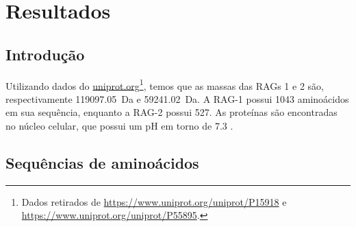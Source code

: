 \documentclass[
	12pt,				%
	openright,			%
	twoside,			%
	a4paper,			%
	]{abntex2}
\begin{document}


\chapter{Resultados}

\section{Introdução}

Utilizando dados do \url{uniprot.org}\footnote{
Dados retirados de \url{https://www.uniprot.org/uniprot/P15918} e \url{https://www.uniprot.org/uniprot/P55895}.}, temos que as massas das RAGs 1 e 2 são, respectivamente \SI{119097.05}{\dalton} e \SI{59241.02}{\dalton}. A RAG-1 possui 1043 aminoácidos em sua sequência, enquanto a RAG-2 possui 527. As proteínas são encontradas no núcleo celular, que possui um pH em torno de \num{7.3} \cite{phmes}.

\section{Sequências de aminoácidos}
\end{document}
